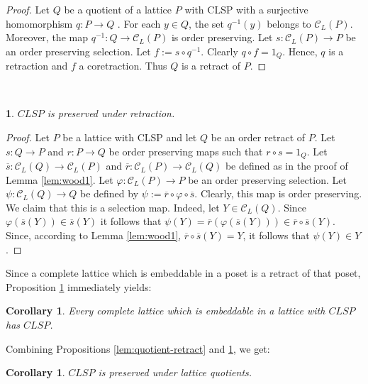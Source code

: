 \documentclass[12pt]{amsart}
\newtheorem{corollary}[definition]{{\bf Corollary}}
\newtheorem{proposition}[definition]{\noindent {\bf Proposition}}
\begin{document}
\begin{proof} 
Let $Q$ be a quotient of a lattice $P$ with CLSP with a surjective
homomorphism $q: P\rightarrow Q$ .  For each $y\in Q$, the set
$q^{-1}(y)$ belongs to $\mathcal{C}_{ L}(P)$.  Moreover, the map
$q^{-1}: Q\rightarrow \mathcal{C}_{ L}(P)$ is order preserving. Let
$s:\mathcal C_{L}(P)\rightarrow P$ be an order preserving
selection. Let $f:=s\circ q^{-1}$. Clearly $q\circ f= 1_{Q}$. Hence,
$q$ is a retraction and $f$ a coretraction. Thus $Q$ is a retract of
$P$.  \end{proof}\\

\begin{proposition} \label{lem:CLSPretraction}
$CLSP$ is preserved under retraction.
\end{proposition}

\begin{proof} 
Let $P$ be a lattice with CLSP and let $Q$ be an order retract of
$P$.  Let $s: Q\rightarrow P$ and $r: P\rightarrow Q$ be order
preserving maps such that $r\circ s =1_{Q}$. Let $\overline s:
\mathcal{C}_L (Q)\rightarrow \mathcal{C}_L (P)$ and $\overline r:
\mathcal{C}_L( P)\rightarrow \mathcal{C}_ L(Q)$ be defined as in the
proof of Lemma \ref{lem:wood1}.  Let $\varphi: \mathcal
C_{L}(P)\rightarrow P$ be an order preserving selection.  Let $\psi:
\mathcal{C}_L (Q)\rightarrow Q$ be defined by $\psi:= \overline r \circ
\varphi \circ \overline s$. Clearly, this map is order preserving. We
claim that this is a selection map. Indeed, let $Y\in \mathcal{C}_{
L}(Q)$.  Since $\varphi(\overline s (Y))\in \overline s(Y)$ it follows
that $\psi (Y)=  \overline r (\varphi(\overline s(Y))) \in \overline r \circ
\overline s(Y)$. Since, according to Lemma \ref {lem:wood1},
$\overline r\circ \overline s(Y)=Y$, it follows that $\psi(Y) \in
Y$. \end{proof}

Since a complete lattice which is embeddable in a poset is a retract
of that poset, Proposition \ref{lem:CLSPretraction} immediately
yields:

\begin{corollary} \label{cor:retract} 
Every complete lattice which is embeddable in a lattice with $CLSP$
has $CLSP$.\\
\end{corollary}

Combining Propositions \ref{lem:quotient-retract} and \ref{lem:CLSPretraction}, we get:

\begin{corollary}\label{cor:CLSPquotient}  
$CLSP$ is preserved under lattice quotients.
\end{corollary}
\end{document}
